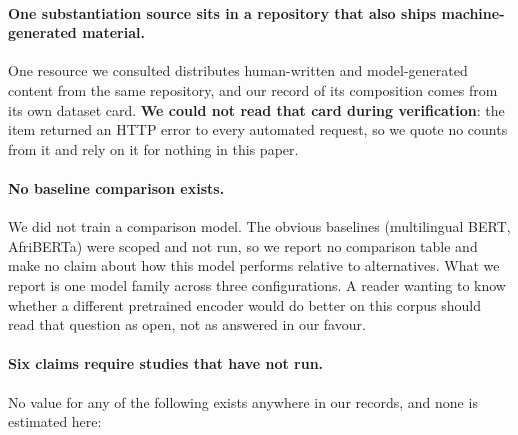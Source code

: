 \paragraph{One substantiation source sits in a repository that also ships
machine-generated material.} One resource we consulted distributes human-written
and model-generated content from the same repository, and our record of its
composition comes from its own dataset card. \textbf{We could not read that card
during verification}: the item returned an HTTP error to every automated
request, so we quote no counts from it and rely on it for nothing in this
paper.

\paragraph{No baseline comparison exists.} We did not train a comparison
model. The obvious baselines (multilingual BERT, AfriBERTa) were scoped
and not run, so we report no comparison table and make no claim about how this
model performs relative to alternatives. What we report is one model family
across three configurations. A reader wanting to know whether a different
pretrained encoder would do better on this corpus should read that question as
open, not as answered in our favour.

\paragraph{Six claims require studies that have not run.} No value for any of
the following exists anywhere in our records, and none is estimated here:

